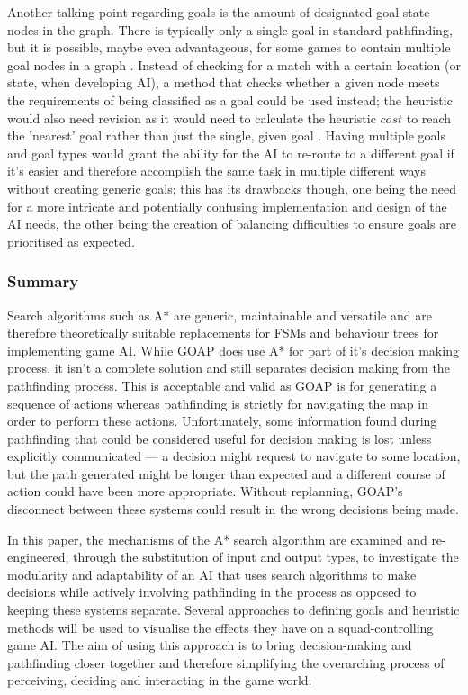 \documentclass[11pt, a4paper]{article}
\begin{document}
Another talking point regarding goals is the amount of designated goal state nodes in the graph. There is typically only a single goal in standard pathfinding, but it is possible, maybe even advantageous, for some games to contain multiple goal nodes in a graph \parencite[272]{millington2019ai}. Instead of checking for a match with a certain location (or state, when developing AI), a method that checks whether a given node meets the requirements of being classified as a goal could be used instead; the heuristic would also need revision as it would need to calculate the heuristic $cost$ to reach the 'nearest' goal rather than just the single, given goal \parencite[272]{millington2019ai}. Having multiple goals and goal types \parencite[121]{higgins2002generic} would grant the ability for the AI to re-route to a different goal if it's easier and therefore accomplish the same task in multiple different ways without creating generic goals; this has its drawbacks though, one being the need for a more intricate and potentially confusing implementation and design of the AI needs, the other being the creation of balancing difficulties to ensure goals are prioritised as expected.

\subsubsection{Summary}

Search algorithms such as A* are generic, maintainable and versatile and are therefore theoretically suitable replacements for FSMs and behaviour trees for implementing game AI. While GOAP does use A* for part of it's decision making process, it isn't a complete solution and still separates decision making from the pathfinding process. This is acceptable and valid as GOAP is for generating a sequence of actions whereas pathfinding is strictly for navigating the map in order to perform these actions. Unfortunately, some information found during pathfinding that could be considered useful for decision making is lost unless explicitly communicated --- a decision might request to navigate to some location, but the path generated might be longer than expected and a different course of action could have been more appropriate. Without replanning, GOAP's disconnect between these systems could result in the wrong decisions being made.

In this paper, the mechanisms of the A* search algorithm are examined and re-engineered, through the substitution of input and output types, to investigate the modularity and adaptability of an AI that uses search algorithms to make decisions while actively involving pathfinding in the process as opposed to keeping these systems separate. Several approaches to defining goals and heuristic methods will be used to visualise the effects they have on a squad-controlling game AI. The aim of using this approach is to bring decision-making and pathfinding closer together and therefore simplifying the overarching process of perceiving, deciding and interacting in the game world.
\end{document}

